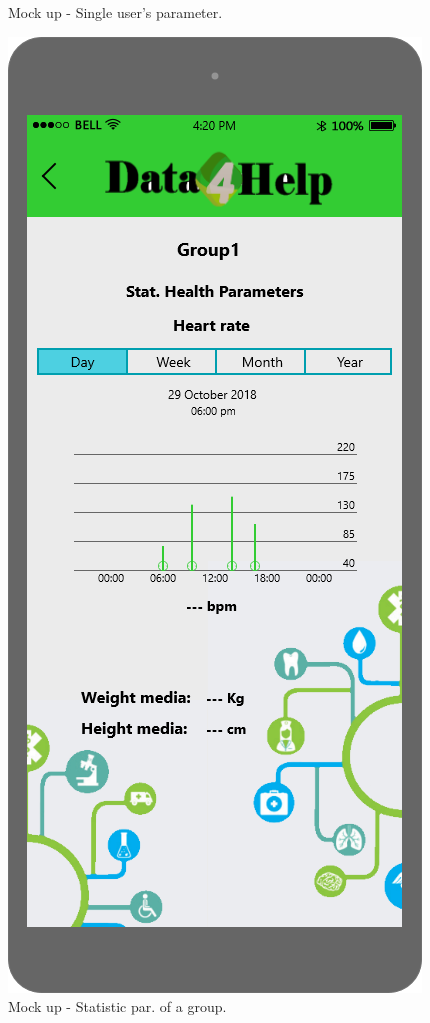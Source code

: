 \begin{figure}[h!]
\begin{minipage}[b]{0.25\textwidth}
    		\caption{Mock up - Single user's parameter.}
	\end{minipage}
	\hfill
	\begin{minipage}[b]{0.25\textwidth}
    		\includegraphics[width=\textwidth]{./pictures/group_stat.png}
    		\caption{Mock up - Statistic par. of a group.}
	\end{minipage}
\end{figure}